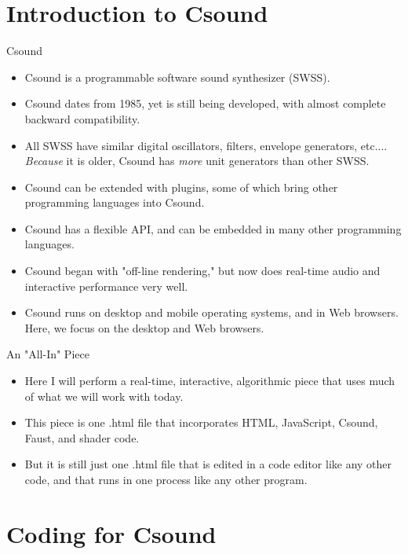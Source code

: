 \documentclass{beamer}
\begin{document}
    \section{Introduction to Csound}
    \begin{frame}{Csound}
        \begin{itemize}
            \item Csound is a programmable software sound synthesizer (SWSS).
            \item Csound dates from 1985, yet is still being developed, with almost
            complete backward compatibility.
            \item All SWSS have similar digital oscillators, filters, envelope generators, etc....
            \textit{Because} it is older, Csound has \textit{more} unit generators
            than other SWSS.
            \item Csound can be extended with plugins, some of which bring other
            programming languages into Csound. 
            \item Csound has a flexible API, and can be embedded in many other
            programming languages.
            \item Csound began with "off-line rendering," but now does real-time
            audio and interactive performance very well.
            \item Csound runs on desktop and mobile operating systems, and in Web
            browsers. Here, we focus on the desktop and Web browsers.
        \end{itemize}
    \end{frame}
    \begin{frame}{An "All-In" Piece}
        \begin{itemize}
            \item Here I will perform a real-time, interactive, algorithmic piece
            that uses much of what we will work with today.
            \item This piece is one .html file that incorporates  HTML, JavaScript, Csound, 
            Faust, and shader code.
            \item But it is still just one .html file that is edited in a code editor
            like any other code, and that runs in one process like any other program.
        \end{itemize}
    \end{frame}
    
    \section{Coding for Csound}
    
\end{document}

